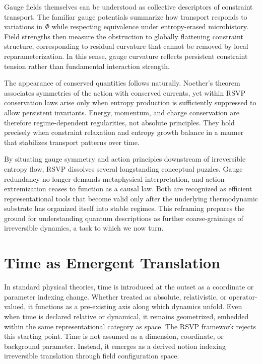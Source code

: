 \documentclass[11pt]{article}
\begin{document}
Gauge fields themselves can be understood as collective descriptors of constraint transport. The familiar gauge potentials summarize how transport responds to variations in $\Phi$ while respecting equivalence under entropy-erased microhistory. Field strengths then measure the obstruction to globally flattening constraint structure, corresponding to residual curvature that cannot be removed by local reparameterization. In this sense, gauge curvature reflects persistent constraint tension rather than fundamental interaction strength.

The appearance of conserved quantities follows naturally. Noether’s theorem associates symmetries of the action with conserved currents, yet within RSVP conservation laws arise only when entropy production is sufficiently suppressed to allow persistent invariants. Energy, momentum, and charge conservation are therefore regime-dependent regularities, not absolute principles. They hold precisely when constraint relaxation and entropy growth balance in a manner that stabilizes transport patterns over time.

By situating gauge symmetry and action principles downstream of irreversible entropy flow, RSVP dissolves several longstanding conceptual puzzles. Gauge redundancy no longer demands metaphysical interpretation, and action extremization ceases to function as a causal law. Both are recognized as efficient representational tools that become valid only after the underlying thermodynamic substrate has organized itself into stable regimes. This reframing prepares the ground for understanding quantum descriptions as further coarse-grainings of irreversible dynamics, a task to which we now turn.

\section{Time as Emergent Translation}

In standard physical theories, time is introduced at the outset as a coordinate or parameter indexing change. Whether treated as absolute, relativistic, or operator-valued, it functions as a pre-existing axis along which dynamics unfold. Even when time is declared relative or dynamical, it remains geometrized, embedded within the same representational category as space. The RSVP framework rejects this starting point. Time is not assumed as a dimension, coordinate, or background parameter. Instead, it emerges as a derived notion indexing irreversible translation through field configuration space.
\end{document}
